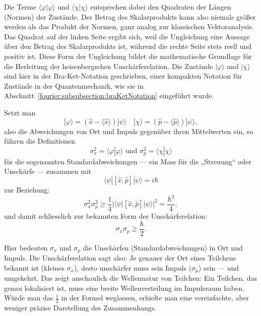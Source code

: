 	Die Terme $\langle\varphi|\varphi\rangle$ und $\langle\chi|\chi\rangle$ entsprechen dabei den Quadraten der Längen (Normen) der Zustände.
	Der Betrag des Skalarprodukts kann also niemals größer werden als das Produkt der Normen, ganz analog zur klassischen Vektoranalysis.
	Das Quadrat auf der linken Seite ergibt sich, weil die Ungleichung eine Aussage über den Betrag des Skalarprodukts ist, während die rechte Seite stets reell und positiv ist.
	Diese Form der Ungleichung bildet die mathematische Grundlage für die Herleitung der heisenbergschen Unschärferelation.
	Die Zustände $|\varphi\rangle$ und $|\chi\rangle$ sind hier in der Bra-Ket-Notation geschrieben, einer kompakten Notation für Zustände in der Quantenmechanik, wie sie in Abschnitt~\ref{fourier:subsubsection:braKetNotation} eingeführt wurde.

	Setzt man
	\begin{equation}
		|\varphi\rangle = (\hat{x} - \langle \hat{x} \rangle) |\psi\rangle \quad |\chi\rangle = (\hat{p} - \langle \hat{p} \rangle) | \psi\rangle,
	\end{equation}
	also die Abweichungen von Ort und Impuls gegenüber ihren Mittelwerten ein, so führen die Definitionen
	\begin{equation}
		\sigma_x^2 = \langle\varphi | \varphi\rangle \text{ und } \sigma_p^2 = \langle\chi | \chi\rangle
	\end{equation}
	für die sogenannten Standardabweichungen --- ein Mass für die „Streuung“ oder Unschärfe --- zusammen mit
	\begin{equation}
		\langle\psi | [\hat{x},\hat{p}] | \psi\rangle = i\hbar
	\end{equation}
	zur Beziehung:
	\begin{equation}
		\sigma_x^2 \sigma_p^2 \ge \frac{1}{4} |\langle\psi | [\hat{x},\hat{p}] | \psi\rangle|^2 = \frac{\hbar^2}{4},
	\end{equation}
	und damit schliesslich zur bekannten Form der Unschärferelation:
	\begin{equation}
		\sigma_x \sigma_p \ge \frac{\hbar}{2}.
	\end{equation}

	Hier bedeuten $\sigma_x$ und $\sigma_p$ die Unschärfen (Standardabweichungen) in Ort und Impuls.
	Die Unschärferelation sagt also:
	Je genauer der Ort eines Teilchens bekannt ist (kleines $\sigma_x$), desto unschärfer muss sein Impuls ($\sigma_p$) sein --- und umgekehrt.
	Das zeigt anschaulich die Wellennatur von Teilchen:
	Ein Teilchen, das genau lokalisiert ist, muss eine breite Wellenverteilung im Impulsraum haben.
	Würde man das $\tfrac{1}{2}$ in der Formel weglassen, erhielte man eine vereinfachte, aber weniger präzise Darstellung des Zusammenhangs.

